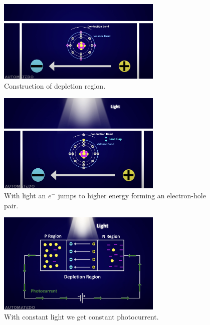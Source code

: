 \documentclass{loyola-beamer}
\begin{document}
\begin{frame}
	\begin{figure}
		\begin{center}
			\includegraphics[width=0.7\textwidth]{./figures/no-light.png}
		\end{center}
		\caption{Construction of depletion region.}
	\end{figure}
\end{frame}

\begin{frame}
	\begin{figure}
		\begin{center}
			\includegraphics[width=0.7\textwidth]{./figures/light-e-jump.png}
		\end{center}
		\caption{With light an $ e^- $ jumps to higher energy forming an electron-hole pair.}
	\end{figure}
\end{frame}

\begin{frame}
	\begin{figure}
		\begin{center}
			\includegraphics[width=0.7\textwidth]{./figures/photocurrent.png}
		\end{center}
		\caption{With constant light we get constant photocurrent.}
	\end{figure}
\end{frame}
\end{document}
